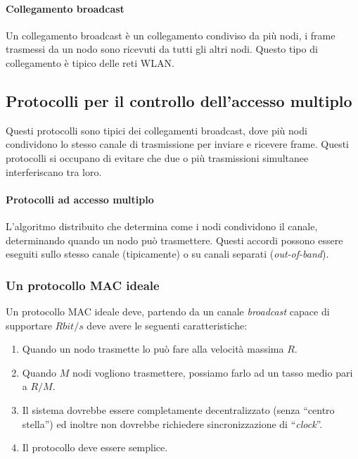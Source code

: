         \paragraph{Collegamento broadcast} Un collegamento broadcast è un collegamento condiviso da più nodi, i frame trasmessi da un nodo sono ricevuti da tutti gli altri nodi. Questo tipo di collegamento è tipico delle reti \Acrshort*{WLAN}.
    \subsection{Protocolli per il controllo dell'accesso multiplo}
        Questi protocolli sono tipici dei collegamenti broadcast, dove più nodi condividono lo stesso canale di trasmissione per inviare e ricevere frame. Questi protocolli si occupano di evitare che due o più trasmissioni simultanee interferiscano tra loro.
        \paragraph{Protocolli ad accesso multiplo} L'algoritmo distribuito che determina come i nodi condividono il canale, determinando quando un nodo può trasmettere. Questi accordi possono essere eseguiti sullo stesso canale (tipicamente) o su canali separati (\textit{out-of-band}).
        \subsubsection{Un protocollo \Acrshort*{MAC} ideale}
            Un protocollo \acrfull*{MAC} ideale deve, partendo da un canale \textit{broadcast} capace di supportare $R bit/s$ deve avere le seguenti caratteristiche:
            \begin{enumerate}
                \item Quando un nodo trasmette lo può fare alla velocità massima $R$.
                \item Quando $M$ nodi vogliono trasmettere, possiamo farlo ad un tasso medio pari a $R/M$.
                \item Il sistema dovrebbe essere completamente decentralizzato (senza ``centro stella'') ed inoltre non dovrebbe richiedere sincronizzazione di ``\textit{clock}''.
                \item Il protocollo deve essere semplice.
            \end{enumerate}
